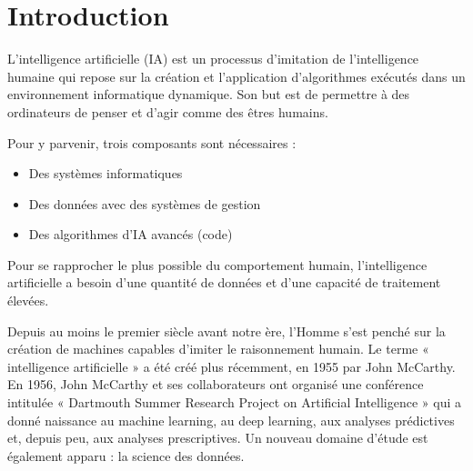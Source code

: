 \section{Introduction}

    L'intelligence artificielle (IA) est un processus d'imitation de l'intelligence humaine qui repose sur la création et l'application d'algorithmes exécutés dans un environnement informatique dynamique. Son but est de permettre à des ordinateurs de penser et d'agir comme des êtres humains.

\vspace{0.5cm}

Pour y parvenir, trois composants sont nécessaires :

\begin{itemize}
    \item Des systèmes informatiques
    \item Des données avec des systèmes de gestion
    \item Des algorithmes d'IA avancés (code)
\end{itemize}

\vspace{0.5cm}

Pour se rapprocher le plus possible du comportement humain, l'intelligence artificielle a besoin d'une quantité de données et d'une capacité de traitement élevées.

Depuis au moins le premier siècle avant notre ère, l'Homme s'est penché sur la création de machines capables d'imiter le raisonnement humain. Le terme « intelligence artificielle » a été créé plus récemment, en 1955 par John McCarthy. En 1956, John McCarthy et ses collaborateurs ont organisé une conférence intitulée « Dartmouth Summer Research Project on Artificial Intelligence » qui a donné naissance au machine learning, au deep learning, aux analyses prédictives et, depuis peu, aux analyses prescriptives. Un nouveau domaine d'étude est également apparu : la science des données.
